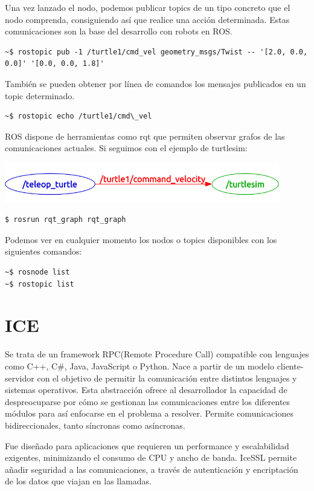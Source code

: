 \documentclass[12pt,spanish,chapterprefix, numbers=noenddot]{book}
\numberwithin{equation}{section}
\numberwithin{figure}{section}
\begin{document}
Una vez lanzado el nodo, podemos publicar topics de un tipo concreto que el nodo comprenda, consiguiendo así que realice una acción determinada. Estas comunicaciones son la base del desarrollo con robots en ROS. 
\begin{lstlisting}
~$ rostopic pub -1 /turtle1/cmd_vel geometry_msgs/Twist -- '[2.0, 0.0, 0.0]' '[0.0, 0.0, 1.8]'
\end{lstlisting}

También se pueden obtener por línea de comandos los mensajes publicados en un topic determinado.
\begin{lstlisting}
~$ rostopic echo /turtle1/cmd\_vel
\end{lstlisting}

ROS dispone de herramientas como rqt que permiten observar grafos de las comunicaciones actuales. Si seguimos con el ejemplo de turtlesim:
\begin{center}
\includegraphics[width=12cm]{Figs/teleopTurtle.png}
\end{center}
\begin{lstlisting}
$ rosrun rqt_graph rqt_graph
\end{lstlisting}
Podemos ver en cualquier momento los nodos o topics disponibles con los siguientes comandos: 
\begin{lstlisting}
~$ rosnode list 
~$ rostopic list
\end{lstlisting}

\section{ICE}
Se trata de un framework RPC(Remote Procedure Call) compatible con lenguajes como C++, C#, Java, JavaScript o Python. Nace a partir de un modelo cliente-servidor con el objetivo de permitir la comunicación entre distintos lenguajes y sistemas operativos. Esta abstracción ofrece al desarrollador la capacidad de despreocuparse por cómo se gestionan las comunicaciones entre los diferentes módulos para así enfocarse en el problema a resolver. Permite comunicaciones bidireccionales, tanto síncronas como asíncronas. 

Fue diseñado para aplicaciones que requieren un performance y escalabilidad exigentes, minimizando el consumo de CPU y ancho de banda. IceSSL permite añadir seguridad a las comunicaciones, a través de autenticación y encriptación de los datos que viajan en las llamadas. 
\end{document}
